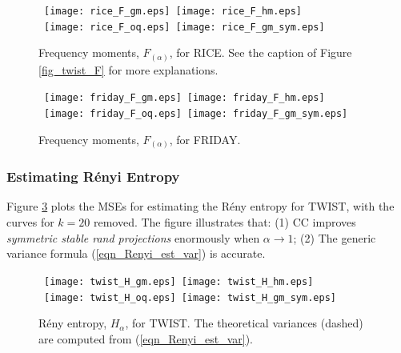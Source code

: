 \documentclass{sig-alternate}
\begin{document}
\newpage

\begin{figure}[h]
\begin{center}\mbox{
{\texttt{[image: rice\_F\_gm.eps]}} \hspace{-0.1in}
{\texttt{[image: rice\_F\_hm.eps]}}}\\\mbox{
{\texttt{[image: rice\_F\_oq.eps]}} \hspace{-0.1in}
{\texttt{[image: rice\_F\_gm\_sym.eps]}}}
\end{center}
\vspace{-0.15in}
\caption{ Frequency moments, $F_{(\alpha)}$, for RICE. See the caption of Figure \ref{fig_twist_F} for more explanations.}\label{fig_rice_F}
\end{figure}
\vspace{-0.2in}
\begin{figure}[h]
\begin{center}\mbox{
{\texttt{[image: friday\_F\_gm.eps]}} \hspace{-0.1in}
{\texttt{[image: friday\_F\_hm.eps]}}}\\\mbox{
{\texttt{[image: friday\_F\_oq.eps]}} \hspace{-0.1in}
{\texttt{[image: friday\_F\_gm\_sym.eps]}}\vspace{-0.1in}
}
\end{center}
\vspace{-0.15in}
\caption{ Frequency moments, $F_{(\alpha)}$, for FRIDAY. }\label{fig_friday_F}
\end{figure}


\vspace{0.2in}
\subsubsection{Estimating R\'enyi Entropy}

Figure \ref{fig_twist_H} plots the MSEs for estimating the R\'eny entropy for TWIST,  with the curves for $k = 20$ removed.
The figure illustrates that: (1) CC improves {\em symmetric stable rand projections} enormously when $\alpha\rightarrow 1$; (2) The generic variance formula (\ref{eqn_Renyi_est_var}) is accurate.

\begin{figure}[h]
\begin{center}\mbox{
{\texttt{[image: twist\_H\_gm.eps]}} \hspace{-0.1in}
{\texttt{[image: twist\_H\_hm.eps]}}}\\\mbox{
{\texttt{[image: twist\_H\_oq.eps]}} \hspace{-0.1in}
{\texttt{[image: twist\_H\_gm\_sym.eps]}}
}
\end{center}
\vspace{-0.15in}
\caption{R\'eny entropy, $H_{\alpha}$, for TWIST. The theoretical variances (dashed) are computed from (\ref{eqn_Renyi_est_var}).  }\label{fig_twist_H}
\end{figure}
\end{document}
